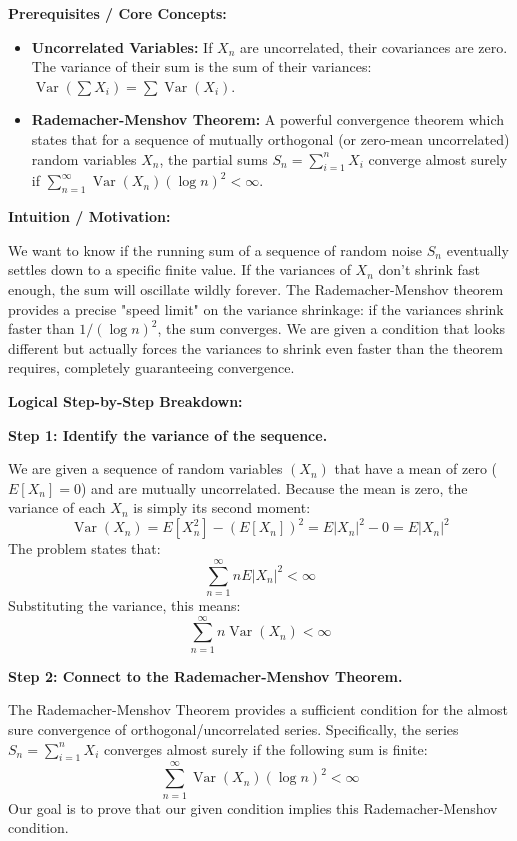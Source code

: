 \begin{solution}
\textbf{Prerequisites / Core Concepts:}
\begin{itemize}
    \item \textbf{Uncorrelated Variables:} If $X_n$ are uncorrelated, their covariances are zero. The variance of their sum is the sum of their variances: $\operatorname{Var}(\sum X_i) = \sum \operatorname{Var}(X_i)$.
    \item \textbf{Rademacher-Menshov Theorem:} A powerful convergence theorem which states that for a sequence of mutually orthogonal (or zero-mean uncorrelated) random variables $X_n$, the partial sums $S_n = \sum_{i=1}^n X_i$ converge almost surely if $\sum_{n=1}^\infty \operatorname{Var}(X_n) (\log n)^2 < \infty$.
\end{itemize}

\textbf{Intuition / Motivation:}

We want to know if the running sum of a sequence of random noise $S_n$ eventually settles down to a specific finite value. If the variances of $X_n$ don't shrink fast enough, the sum will oscillate wildly forever. The Rademacher-Menshov theorem provides a precise "speed limit" on the variance shrinkage: if the variances shrink faster than $1/(\log n)^2$, the sum converges. We are given a condition that looks different but actually forces the variances to shrink even faster than the theorem requires, completely guaranteeing convergence.

\textbf{Logical Step-by-Step Breakdown:}

\textbf{Step 1: Identify the variance of the sequence.}

We are given a sequence of random variables $(X_n)$ that have a mean of zero ($E[X_n] = 0$) and are mutually uncorrelated.
Because the mean is zero, the variance of each $X_n$ is simply its second moment:
\[ \operatorname{Var}(X_n) = E[X_n^2] - (E[X_n])^2 = E|X_n|^2 - 0 = E|X_n|^2 \]
The problem states that:
\[ \sum_{n=1}^\infty n E|X_n|^2 < \infty \]
Substituting the variance, this means:
\[ \sum_{n=1}^\infty n \operatorname{Var}(X_n) < \infty \]

\textbf{Step 2: Connect to the Rademacher-Menshov Theorem.}

The Rademacher-Menshov Theorem provides a sufficient condition for the almost sure convergence of orthogonal/uncorrelated series. Specifically, the series $S_n = \sum_{i=1}^n X_i$ converges almost surely if the following sum is finite:
\[ \sum_{n=1}^\infty \operatorname{Var}(X_n) (\log n)^2 < \infty \]
Our goal is to prove that our given condition implies this Rademacher-Menshov condition.


\end{solution}
